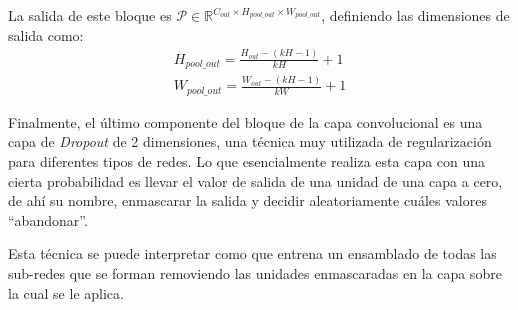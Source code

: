 \documentclass[spanish]{article}
\theoremstyle{definition}
\theoremstyle{remark}
\numberwithin{equation}{section}
\numberwithin{equation}{section} %
\begin{document}
\par
La salida de este bloque es $\mathcal{P} \in \mathbb{R}^{C_{out} \times H_{pool\_out} \times W_{pool\_out}}$, definiendo las dimensiones de salida como:
\begin{equation}
\label{MaxPool2d_dimensions}
\begin{split}
H_{pool\_out}=\frac{H_{out}-(kH-1)}{kH} +1 \\
W_{pool\_out}=\frac{W_{out}-(kH-1)}{kW} +1
\end{split}
\end{equation} \par
\par
\par
Finalmente, el último componente del bloque de la capa convolucional es una capa de \textit{Dropout} \cite{srivastava2014dropout} de 2 dimensiones, una técnica muy utilizada de regularización para diferentes tipos de redes. Lo que esencialmente realiza esta capa con una cierta probabilidad es llevar el valor de salida de una unidad de una capa a cero, de ahí su nombre, enmascarar la salida y decidir aleatoriamente cuáles valores ``abandonar''. 

Esta técnica se puede interpretar como que entrena un ensamblado de todas las sub-redes que se forman removiendo las unidades enmascaradas en la capa sobre la cual se le aplica. 
\end{document}
